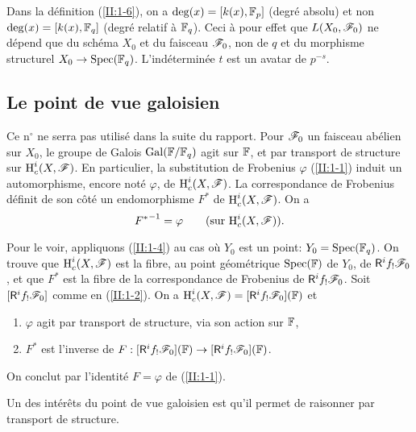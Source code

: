 \documentclass[oneside]{book}
\begin{document}
Dans la définition (\ref{II:1-6}), on a $\deg(x)=[k(x),\mathbb{F}_p]$ (degré 
absolu) et non $\deg(x)=[k(x),\mathbb{F}_q]$ (degré relatif à $\mathbb{F}_q$). Ceci à 
pour effet que $L(X_0,\mathscr{F}_0)$ ne dépend que du schéma $X_0$ et du faisceau 
$\mathscr{F}_0$, non de $q$ et du morphisme structurel $X_0\to\operatorname{Spec}(\mathbb{F}_q)$. 
L'indéterminée $t$ est un avatar de $p^{-s}$. 





\subsection{Le point de vue galoisien}\label{II:1-8}

Ce n$^\circ$ ne serra pas utilisé dans la suite du rapport. Pour $\mathscr{F}_0$ un 
faisceau abélien sur $X_0$, le groupe de Galois $\operatorname{Gal}(\mathbb{F}/\mathbb{F}_q)$ agit sur 
$\mathbb{F}$, et par transport de structure sur $\operatorname{H}_c^i(X,\mathscr{F})$. En particulier, la 
substitution de Frobenius $\varphi$ (\ref{II:1-1}) induit un automorphisme, 
encore noté $\varphi$, de $\operatorname{H}_c^i(X,\mathscr{F})$. La correspondance de Frobenius 
définit de son côté un endomorphisme $F^*$ de $\operatorname{H}_c^i(X,\mathscr{F})$. On a 
\begin{equation}\label{II:eq:2}
  {F^*}^{-1} = \varphi \qquad \text{(sur $\operatorname{H}_c^i(X,\mathscr{F})$).}
\end{equation}

Pour le voir, appliquons (\ref{II:1-4}) au cas où $Y_0$ est un point: 
$Y_0=\operatorname{Spec}(\mathbb{F}_q)$. On trouve que $\operatorname{H}_c^i(X,\mathscr{F})$ est la fibre, au point 
géométrique $\operatorname{Spec}(\mathbb{F})$ de $Y_0$, de $\mathsf{R}^i f_! \mathscr{F}_0$, et que $F^*$ est 
la fibre de la correspondance de Frobenius de $\mathsf{R}^i f_!\mathscr{F}_0$. Soit 
$[\mathsf{R}^i f_! \mathscr{F}_0]$ comme en (\ref{II:1-2}). On a 
$\operatorname{H}_c^i(X,\mathscr{F}) = [\mathsf{R}^i f_!\mathscr{F}_0](\mathbb{F})$ et 
\begin{enumerate}[\indent a)]
  \item $\varphi$ agit par transport de structure, via son action sur $\mathbb{F}$, 
  \item $F^*$ est l'inverse de 
    $F:[\mathsf{R}^i f_!\mathscr{F}_0](\mathbb{F}) \to [\mathsf{R}^i f_!\mathscr{F}_0](\mathbb{F})$. 
\end{enumerate}

On conclut par l'identité $F=\varphi$ de (\ref{II:1-1}). 

Un des intérêts du point de vue galoisien est qu'il permet de raisonner par 
transport de structure. 
\end{document}
